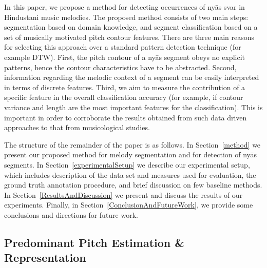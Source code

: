 {{In this paper, we propose a method for detecting occurrences of ny\={a}s svar in Hindustani music melodies. The proposed method consists of two main steps: segmentation based on domain knowledge, and segment classification based on a set of musically motivated pitch contour features. There are three main reasons for selecting this approach over a standard pattern detection technique (for example DTW). First, the pitch contour of a ny\={a}s segment obeys no explicit patterns, hence the contour characteristics have to be abstracted. Second, information regarding the melodic context of a segment can be easily interpreted in terms of discrete features. Third, we aim to measure the contribution of a specific feature in the overall classification accuracy (for example, if contour variance and length are the most important features for the classification). This is important in order to corroborate the results obtained from such data driven approaches to that from musicological studies.

The structure of the remainder of the paper is as follows. In Section~\ref{method} we present our proposed method for melody segmentation and for detection of ny\={a}s segments. In Section~\ref{experimentalSetup} we describe  our experimental setup, which includes description of the data set and measures used for evaluation, the ground truth annotation procedure, and brief discussion on few baseline methods. In Section~\ref{ResultsAndDiscussion} we present and discuss the results of our experiments. Finally, in Section~\ref{ConclusionAndFutureWork}, we provide some conclusions and directions for future work.



\subsection{Predominant Pitch Estimation \& Representation}

}}
